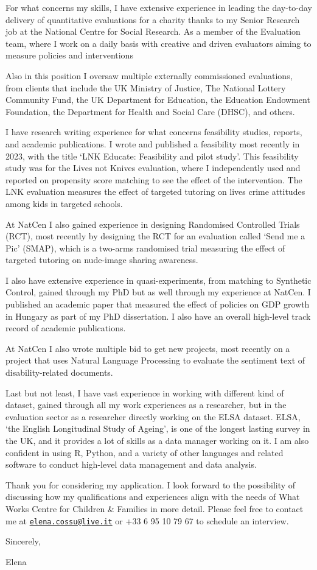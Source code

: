 \documentclass[11pt,a4paper,]{awesome-cv}
\begin{document}
For what concerns my skills, I have extensive experience in leading the
day-to-day delivery of quantitative evaluations for a charity thanks to
my Senior Research job at the National Centre for Social Research. As a
member of the Evaluation team, where I work on a daily basis with
creative and driven evaluators aiming to measure policies and
interventions

Also in this position I oversaw multiple externally commissioned
evaluations, from clients that include the UK Ministry of Justice, The
National Lottery Community Fund, the UK Department for Education, the
Education Endowment Foundation, the Department for Health and Social
Care (DHSC), and others.

I have research writing experience for what concerns feasibility
studies, reports, and academic publications. I wrote and published a
feasibility most recently in 2023, with the title `LNK Educate:
Feasibility and pilot study'. This feasibility study was for the Lives
not Knives evaluation, where I independently used and reported on
propensity score matching to see the effect of the intervention. The LNK
evaluation measures the effect of targeted tutoring on lives crime
attitudes among kids in targeted schools.

At NatCen I also gained experience in designing Randomised Controlled
Trials (RCT), most recently by designing the RCT for an evaluation
called `Send me a Pic' (SMAP), which is a two-arms randomised trial
measuring the effect of targeted tutoring on nude-image sharing
awareness.

I also have extensive experience in quasi-experiments, from matching to
Synthetic Control, gained through my PhD but as well through my
experience at NatCen. I published an academic paper that measured the
effect of policies on GDP growth in Hungary as part of my PhD
dissertation. I also have an overall high-level track record of academic
publications.

At NatCen I also wrote multiple bid to get new projects, most recently
on a project that uses Natural Language Processing to evaluate the
sentiment text of disability-related documents.

Last but not least, I have vast experience in working with different
kind of dataset, gained through all my work experiences as a researcher,
but in the evaluation sector as a researcher directly working on the
ELSA dataset. ELSA, `the English Longitudinal Study of Ageing', is one
of the longest lasting survey in the UK, and it provides a lot of skills
as a data manager working on it. I am also confident in using R, Python,
and a variety of other languages and related software to conduct
high-level data management and data analysis.

Thank you for considering my application. I look forward to the
possibility of discussing how my qualifications and experiences align
with the needs of What Works Centre for Children \& Families in more
detail. Please feel free to contact me at
\href{mailto:elena.cossu@live.it}{\nolinkurl{elena.cossu@live.it}} or
+33 6 95 10 79 67 to schedule an interview.

Sincerely,

Elena
\end{document}
